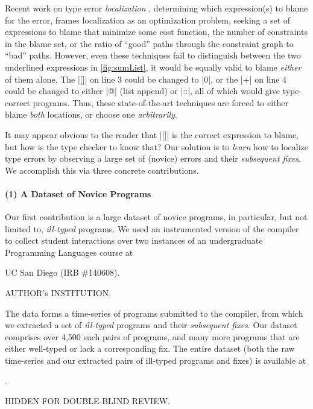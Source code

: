 Recent work on type error \emph{localization}
%
\citep[\eg][]{Zhang2014-lv,Loncaric2016-uk,Pavlinovic2014-mr},
%
determining which expression(s) to blame for the error,
frames localization as an optimization problem, seeking a set of
expressions to blame that minimize some cost function, \eg the number of
constraints in the blame set, or the ratio of ``good'' paths through the
constraint graph to ``bad'' paths.
%
However, even these techniques fail to distinguish between the two
underlined expressions in \autoref{fig:sumList}, it would be equally
valid to blame \emph{either} of them alone.
%
The |[]| on line 3 could be changed to |0|, or the |+| on line 4 could
be changed to either |@| (list append) or |::|, all of which would give
type-correct programs.
%
Thus, these state-of-the-art techniques are forced to either blame
\emph{both} locations, or choose one \emph{arbitrarily}.

It may appear obvious to the reader that |[]| is the correct expression
to blame, but how is the type checker to know that?
%
Our solution is to \emph{learn} how to localize type errors by observing
a large set of (novice) errors and their \emph{subsequent fixes}.
%
We accomplish this via three concrete contributions.

\paragraph{\textbf{(1) A Dataset of Novice \ocaml Programs}}
Our first contribution is a large dataset of novice \ocaml programs,
in particular, but not limited to, \emph{ill-typed} programs.
%
We used an instrumented version of the \ocaml compiler to collect
student interactions over two instances of an undergraduate Programming
Languages course at
%
\begin{anonsuppress}
UC San Diego (IRB \#140608).
\end{anonsuppress}
\begin{noanonsuppress}
AUTHOR's INSTITUTION.
\end{noanonsuppress}
%
The data forms a time-series of programs submitted to the \ocaml
compiler, from which we extracted a set of \emph{ill-typed} programs
and their \emph{subsequent fixes}.
%
Our dataset comprises over 4,500 such pairs of programs, and many more
programs that are either well-typed or lack a corresponding fix.
%
The entire dataset (both the raw time-series and our extracted pairs of
ill-typed programs and fixes) is available at
%
\begin{anonsuppress}
.
\end{anonsuppress}
\begin{noanonsuppress}
HIDDEN FOR DOUBLE-BLIND REVIEW.
\end{noanonsuppress}
%

